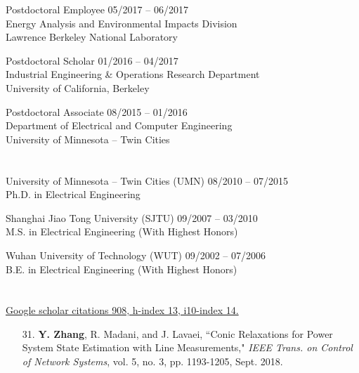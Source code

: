 \documentclass[margin,line]{res}
\begin{document}
\begin{resume}
Postdoctoral Employee \hfill  05/2017 -- 06/2017\\
Energy Analysis and Environmental Impacts Division \\
Lawrence Berkeley National Laboratory


Postdoctoral Scholar \hfill  01/2016 -- 04/2017\\
Industrial Engineering \& Operations Research Department\\
University of California, Berkeley  


Postdoctoral Associate \hfill  08/2015 -- 01/2016 \\
Department of Electrical and Computer Engineering  \\
University of Minnesota -- Twin Cities 
 
\vspace{.2cm}


\section{}

University of Minnesota -- Twin Cities (UMN)  \hfill  08/2010 -- 07/2015 \\
Ph.D. in Electrical Engineering 


Shanghai Jiao Tong University (SJTU)  \hfill  09/2007 -- 03/2010\\
M.S. in Electrical Engineering  (With Highest Honors)


Wuhan University of Technology (WUT)   \hfill  09/2002 -- 07/2006\\
B.E. in Electrical Engineering  (With Highest Honors)

\vspace{.2cm}




\section{}  

{\href{https://scholar.google.com/citations?user=mt3m9bIAAAAJ&hl=en/}{Google scholar citations 908, h-index 13, i10-index 14.}}
\vspace{.2cm}

\begin{enumerate}\setcounter{enumi}{\value{saveenum}}



\item[31.] \textbf{Y. Zhang}, R. Madani, and J. Lavaei,
``Conic Relaxations for Power System State Estimation with Line Measurements,"
\emph{IEEE Trans. on Control of Network Systems}, vol. 5, no. 3, pp. 1193-1205, Sept. 2018.



\end{enumerate}
\end{resume}
\end{document}
